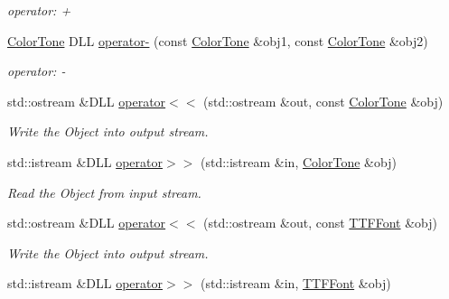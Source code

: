 \begin{DoxyCompactItemize}
\begin{DoxyCompactList}\small\item\em operator: + \item\end{DoxyCompactList}\item 
\hypertarget{namespace_f2_c_af3bc25e0402758c3b3a1a64d1c80052d}{
\hyperlink{class_f2_c_1_1_color_tone}{ColorTone} DLL \hyperlink{namespace_f2_c_af3bc25e0402758c3b3a1a64d1c80052d}{operator-\/} (const \hyperlink{class_f2_c_1_1_color_tone}{ColorTone} \&obj1, const \hyperlink{class_f2_c_1_1_color_tone}{ColorTone} \&obj2)}
\label{namespace_f2_c_af3bc25e0402758c3b3a1a64d1c80052d}

\begin{DoxyCompactList}\small\item\em operator: -\/ \item\end{DoxyCompactList}\item 
std::ostream \&DLL \hyperlink{namespace_f2_c_a0c34714cdd5cc2ce9a63adc7d6ecaa6b}{operator$<$$<$} (std::ostream \&out, const \hyperlink{class_f2_c_1_1_color_tone}{ColorTone} \&obj)
\begin{DoxyCompactList}\small\item\em Write the Object into output stream. \item\end{DoxyCompactList}\item 
std::istream \&DLL \hyperlink{namespace_f2_c_a444abf1cb3e73da3e5d74e1f924a88ca}{operator$>$$>$} (std::istream \&in, \hyperlink{class_f2_c_1_1_color_tone}{ColorTone} \&obj)
\begin{DoxyCompactList}\small\item\em Read the Object from input stream. \item\end{DoxyCompactList}\item 
std::ostream \&DLL \hyperlink{namespace_f2_c_a26c99e85a655966a34141b0ea3b4a305}{operator$<$$<$} (std::ostream \&out, const \hyperlink{class_f2_c_1_1_t_t_f_font}{TTFFont} \&obj)
\begin{DoxyCompactList}\small\item\em Write the Object into output stream. \item\end{DoxyCompactList}\item 
std::istream \&DLL \hyperlink{namespace_f2_c_ad165b93a684dfe4ae3f8583a1a036163}{operator$>$$>$} (std::istream \&in, \hyperlink{class_f2_c_1_1_t_t_f_font}{TTFFont} \&obj)

\end{DoxyCompactItemize}
